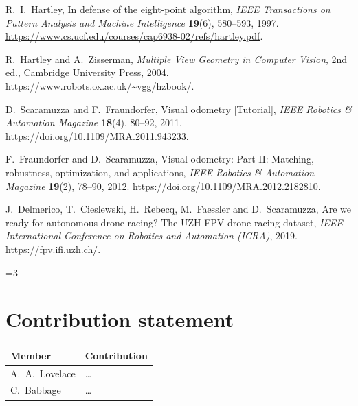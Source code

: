 \documentclass[11pt,a4paper]{article}
\newcommand{\stage}{1}
\newif\ifshowguide
\theoremstyle{plain}
\theoremstyle{definition}
\theoremstyle{remark}
\newcommand{\guide}[1]{\ifshowguide\par\smallskip\noindent
  \colorbox{gray!12}{\parbox{\dimexpr\linewidth-2\fboxsep}{\small\itshape
  \textbf{Guidance.} #1}}\par\smallskip\fi}
\begin{document}
\begin{thebibliography}{9}

R.~I.~Hartley,
In defense of the eight-point algorithm,
\emph{IEEE Transactions on Pattern Analysis and Machine Intelligence}
\textbf{19}(6), 580--593, 1997.
\url{https://www.cs.ucf.edu/courses/cap6938-02/refs/hartley.pdf}.

R.~Hartley and A.~Zisserman,
\emph{Multiple View Geometry in Computer Vision}, 2nd ed.,
Cambridge University Press, 2004.
\url{https://www.robots.ox.ac.uk/~vgg/hzbook/}.

D.~Scaramuzza and F.~Fraundorfer,
Visual odometry [Tutorial],
\emph{IEEE Robotics \& Automation Magazine}
\textbf{18}(4), 80--92, 2011.
\url{https://doi.org/10.1109/MRA.2011.943233}.

F.~Fraundorfer and D.~Scaramuzza,
Visual odometry: Part II: Matching, robustness, optimization, and applications,
\emph{IEEE Robotics \& Automation Magazine}
\textbf{19}(2), 78--90, 2012.
\url{https://doi.org/10.1109/MRA.2012.2182810}.

J.~Delmerico, T.~Cieslewski, H.~Rebecq, M.~Faessler and D.~Scaramuzza,
Are we ready for autonomous drone racing? The UZH-FPV drone racing dataset,
\emph{IEEE International Conference on Robotics and Automation (ICRA)}, 2019.
\url{https://fpv.ifi.uzh.ch/}.

\end{thebibliography}

\ifnum\stage=3
\appendix

\section{Contribution statement}

\guide{Required. Who did what, agreed by all members. Staff may adjust
an individual grade if contributions are clearly unequal.}

\noindent
\begin{tabularx}{\linewidth}{@{}lX@{}}
  \toprule
  Member & Contribution \\
  \midrule
  A.~A.~Lovelace & \dots \\
  C.~Babbage     & \dots \\
  \bottomrule
\end{tabularx}
\end{document}
